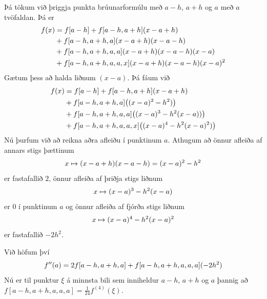 \documentclass[letterpaper,10pt,icelandic]{sphinxmanual}
\begin{document}
Þá tökum við þriggja punkta brúunarformúlu með \(a-h\), \(a+h\)
og \(a\) með \(a\) tvöfaldan. Þá er
\begin{gather}
\begin{split}\begin{aligned}
  f(x)&=f[a-h]+f[a-h,a+h](x-a+h)\\
  &+f[a-h,a+h,a](x-a+h)(x-a-h)\\
  &+f[a-h,a+h,a,a](x-a+h)(x-a-h)(x-a)\\
  &+f[a-h,a+h,a,a,x](x-a+h)(x-a-h)(x-a)^2\end{aligned}\end{split}\notag
\end{gather}
Gætum þess að halda liðnum \((x-a)\). Þá fáum við
\begin{gather}
\begin{split}\begin{aligned}
  f(x)&=f[a-h]+f[a-h,a+h](x-a+h)\\
  &+f[a-h,a+h,a]\big((x-a)^2-h^2)\big)\\
  &+f[a-h,a+h,a,a]\big((x-a)^3-h^2(x-a))\big)\\
  &+f[a-h,a+h,a,a,x]\big((x-a)^4-h^2(x-a)^2)\big)\end{aligned}\end{split}\notag
\end{gather}
Nú þurfum við að reikna aðra afleiðu í punktinum \(a\). Athugum að
önnur afleiða af annars stigs þættinum
\begin{gather}
\begin{split}x\mapsto (x-a+h)(x-a-h)=(x-a)^2-h^2\end{split}\notag
\end{gather}
er fastafallið \(2\), önnur afleiða af þriðja stigs liðnum
\begin{gather}
\begin{split}x\mapsto (x-a)^3-h^2(x-a)\end{split}\notag
\end{gather}
er \(0\) í punktinum \(a\) og önnur afleiða af fjórða stigs
liðnum
\begin{gather}
\begin{split}x\mapsto (x-a)^4-h^2(x-a)^2\end{split}\notag
\end{gather}
er fastafallið \(-2h^2\).

Við höfum því
\begin{gather}
\begin{split}f''(a)=2f[a-h,a+h,a]+f[a-h,a+h,a,a,a](-2h^2)\end{split}\notag
\end{gather}
Nú er til punktur \(\xi\) á minnsta bili sem inniheldur \(a-h\),
\(a+h\) og \(a\) þannig að \(f[a-h,a+h,a,a,a]=\tfrac
1{24}f^{(4)}(\xi)\).
\end{document}
